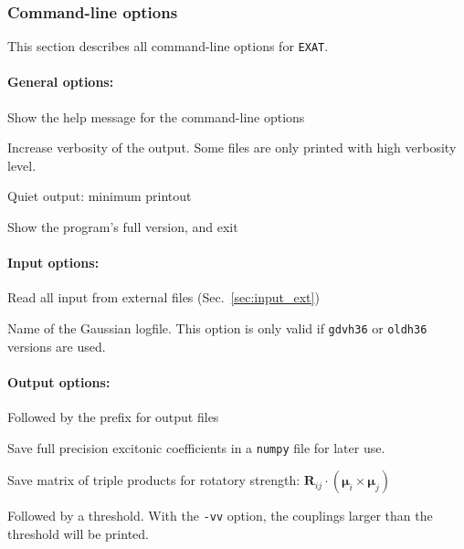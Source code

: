 \documentclass[a4paper,11pt]{article}
\newcommand{\bs}{\boldsymbol}
\begin{document}
\subsubsection{Command-line options}

This section describes all command-line options for \texttt{EXAT}. 

\paragraph*{General options:}
\begin{description}[labelsep=10pt, align=left, labelwidth=80pt,labelindent=0pt,leftmargin=90pt]
\item[\texttt{-h}] Show the help message for the command-line options
\item[\texttt{-v}] Increase verbosity of the output. Some files are only printed with high verbosity level.
\item[\texttt{-q}] Quiet output: minimum printout 
\item[\texttt{-V}] Show the program's full version, and exit
\end{description}

\paragraph*{Input options:}
\begin{description}[labelsep=10pt, align=left, labelwidth=80pt,labelindent=0pt,leftmargin=90pt]
\item[\texttt{-e}] Read all input from external files (Sec.~\ref{sec:input_ext}) 
\item[\texttt{-{}-log,-i}] Name of the Gaussian logfile. This option is only valid if \texttt{gdvh36} or \texttt{oldh36} versions are used.
\end{description}

\paragraph*{Output options:}
\begin{description}[labelsep=10pt, align=left, labelwidth=80pt,labelindent=0pt,leftmargin=90pt]
\item[\texttt{-{}-out,-o}] Followed by the prefix for output files 
\item[\texttt{-{}-savecoeff}] Save full precision excitonic coefficients in a \texttt{numpy} file for later use.
\item[\texttt{-{}-savetprod}] Save matrix of triple products for rotatory strength: $\mathbf{R}_{ij}\cdot(\bs{\mu}_i\times\bs{\mu}_j)$
\item[\texttt{-{}-prtcoup}] Followed by a threshold. With the \texttt{-vv} option, the couplings larger than the threshold will be printed. 
\end{description}
\end{document}
